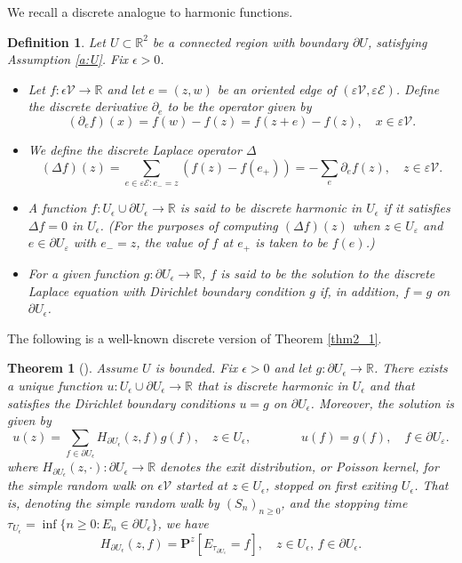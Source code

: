 \documentclass[11pt]{article}
\newtheorem{theorem}{Theorem}[section]
\newtheorem{definition}{Definition}[section]
\theoremstyle{remark}
\def\eps{\varepsilon}
\def\Pr{\mathbf{P}}
\def\cV{\mathcal{V}}
\def\cE{\mathcal{E}}
\begin{document}
We recall a discrete analogue to harmonic functions.
\begin{definition}
\label{def2_2}
    Let $U\subset\mathbb{R}^2$ be a connected region with boundary \(\partial U\), satisfying
    Assumption \ref{a:U}. Fix \(\epsilon > 0\).
    \begin{itemize}
        \item Let $f : \epsilon\cV \rightarrow \mathbb{R}$ and let $e = (z,w)$ be an oriented edge of $(\eps\cV, \eps \cE)$. 
        Define the discrete derivative $\partial_e$ to be the operator given by 
            \[
                (\partial_e f)(x) = f(w) - f(z) 
                = f(z+e) - f(z), \quad x \in \eps\cV.
            \] 
        \item We define the discrete Laplace operator $\Delta$
            \[
                (\Delta f)(z) = \sum_{e \in \eps\cE : e_- = z} (f(z)-f(e_+)) 
                = -\sum_{e} \partial_e f(z), \quad z\in\eps\cV.
            \]
        \item A function \(f : U_\epsilon \cup \partial U_\epsilon \rightarrow \mathbb{R}\) is said to be discrete harmonic in \(U_\epsilon\) if it satisfies \(\Delta f = 0\) in \(U_\epsilon\). (For the purposes of computing $(\Delta f)(z)$ when $z \in U_\eps$ 
        and $e \in \partial U_\eps$ with $e_- = z$, the value of $f$ at $e_+$ is taken to be $f(e)$.)
        \item For a given function \(g : \partial U_\epsilon \rightarrow \mathbb{R}\), $f$ is said to be the solution to the discrete Laplace equation with Dirichlet boundary condition \(g\) if, in addition, \(f = g\) on \(\partial U_\epsilon\).
        \end{itemize}
\end{definition}
The following is a well-known discrete version of Theorem \ref{thm2_1}.
\begin{theorem}[{\cite[Theorem 6.2.1]{LL2010}}]
\label{thm2_2}
    Assume $U$ is bounded. Fix \(\epsilon > 0\) and 
    let \(g : \partial U_\epsilon \rightarrow \mathbb{R}\). 
    There exists a unique function $u : U_\epsilon \cup \partial U_\epsilon\rightarrow \mathbb{R}$ that is discrete harmonic in \(U_\epsilon\) and that satisfies the Dirichlet boundary conditions \(u = g\) on \(\partial U_\epsilon\). Moreover, the solution is given by 
    \[
        u(z) = \sum_{f \in\partial U_\epsilon} H_{\partial U_\epsilon}(z,f) g(f), 
             \quad z \in U_\epsilon, \qquad\qquad u(f) = g(f), \quad f \in \partial U_\eps.
    \]
    where \(H_{\partial U_\epsilon}(z, \cdot) : \partial U_\epsilon \rightarrow \mathbb{R}\) denotes the exit distribution, or Poisson kernel, for the simple random walk on \(\epsilon\cV\) started at \(z\in U_\epsilon\), stopped on first exiting \(U_\epsilon\). 
    That is, denoting the simple random walk by \((S_n)_{n\geq 0}\), and the stopping 
    time \(\tau_{U_\epsilon} = \inf\{n \geq 0 : E_n \in \partial U_\epsilon\}\), we have 
    \[
        H_{\partial U_\epsilon}(z,f) 
        = \Pr^z[E_{\tau_{\partial U_\epsilon}} = f ], \quad
          z\in U_\epsilon, \, f \in \partial U_\epsilon.
    \]
\end{theorem}
\end{document}
